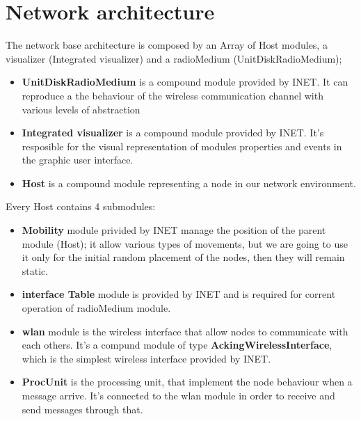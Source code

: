 \section{Network architecture}
The network base architecture is composed by an Array of Host modules, a visualizer (Integrated visualizer) and a radioMedium (UnitDiskRadioMedium);
\begin{itemize}
    \item \textbf{UnitDiskRadioMedium} is a compound module provided by INET. It can reproduce a the behaviour of the wireless communication 
    channel with various levels of abstraction
    \item \textbf{Integrated visualizer} is a compound module provided by INET. It's resposible for the visual representation of modules properties 
    and events in the graphic user interface.
    \item \textbf{Host} is a compound module representing a node in our network environment. 
\end{itemize}
Every Host contains 4 submodules:
\begin{itemize}
    \item \textbf{Mobility} module privided by INET manage the position of the parent module (Host); it allow various types of movements,
        but we are going to use it only for the initial random placement of the nodes, then they will remain static.
    \item \textbf{interface Table} module is provided by INET and is required for corrent operation of radioMedium module.
    \item \textbf{wlan} module is the wireless interface that allow nodes to communicate with each others. It's a compund module of type 
        \textbf{AckingWirelessInterface}, which is the simplest wireless interface provided by INET.
    \item \textbf{ProcUnit} is the processing unit, that implement the node behaviour when a message arrive. It's connected to
    the wlan module in order to receive and send messages through that.
\end{itemize}

